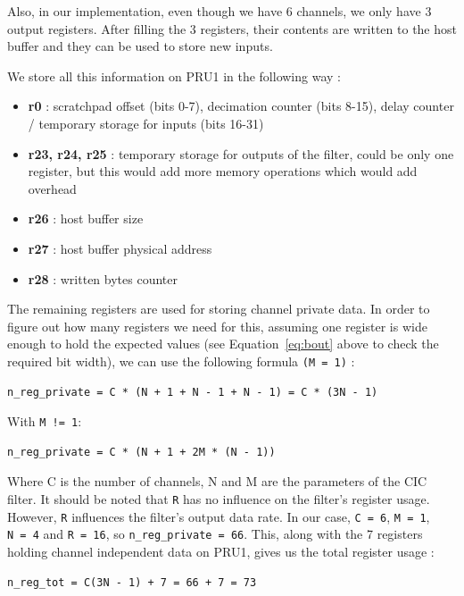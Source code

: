 \documentclass[]{report}
\providecommand{\tightlist}{%
	\setlength{\itemsep}{0pt}\setlength{\parskip}{0pt}}
\begin{document}
Also, in our implementation, even though we have 6 channels, we only have 3 output registers. After filling the 3 registers, their contents are written to the host buffer and they can be used to store new inputs.

We store all this information on PRU1 in the following way :

\begin{itemize}
\tightlist
\item
  \textbf{r0} : scratchpad offset (bits 0-7), decimation counter (bits
  8-15), delay counter / temporary storage for inputs (bits 16-31)
\item
  \textbf{r23, r24, r25} : temporary storage for outputs of the filter,
  could be only one register, but this would add more memory operations
  which would add overhead
\item
  \textbf{r26} : host buffer size
\item
  \textbf{r27} : host buffer physical address
\item
  \textbf{r28} : written bytes counter
\end{itemize}

The remaining registers are used for storing channel private data. In order to figure out how many registers we need for this, assuming one register is wide enough to hold the expected values (see Equation~\ref{eq:bout} above to check the required bit width), we can use the following formula \texttt{(M = 1)} :

\begin{verbatim}
n_reg_private = C * (N + 1 + N - 1 + N - 1) = C * (3N - 1)
\end{verbatim}

\noindent With \texttt{M\ !=\ 1}:

\begin{verbatim}
n_reg_private = C * (N + 1 + 2M * (N - 1))
\end{verbatim}

Where C is the number of channels, N and M are the parameters of the CIC
filter. It should be noted that \texttt{R} has no influence on the
filter's register usage. However, \texttt{R} influences the filter's
output data rate. In our case, \texttt{C\ =\ 6}, \texttt{M\ =\ 1},
\texttt{N\ =\ 4} and \texttt{R\ =\ 16}, so
\texttt{n\_reg\_private\ =\ 66}. This, along with the 7 registers holding channel independent data on
PRU1, gives us the total register usage :

\begin{verbatim}
n_reg_tot = C(3N - 1) + 7 = 66 + 7 = 73
\end{verbatim}
\end{document}
